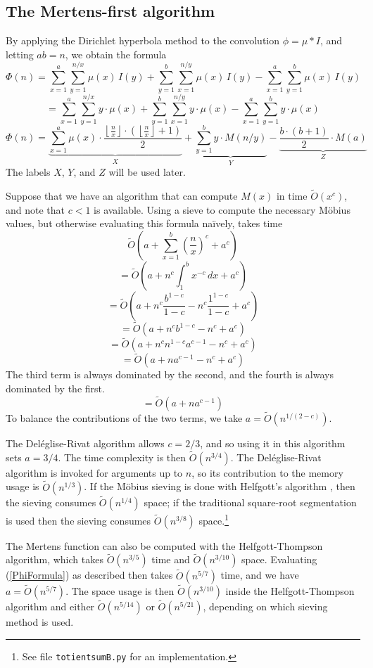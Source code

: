 \documentclass[12pt]{article}
\newcommand{\eqn}[1]{\begin{displaymath} #1 \end{displaymath}}
\newcommand{\neqn}[1]{\begin{equation} #1 \end{equation}}
\newcommand{\floor}[1]{{\left\lfloor #1 \right\rfloor}}
\newcommand{\integral}[4]{\displaystyle\int_{#3}^{#4} \! #1 \, d#2}
\newcommand{\floordiv}[2]{\floor{\frac{#1}{#2}}}
\newcommand{\softO}[0]{\widetilde{O}}
\begin{document}
\subsection{The Mertens-first algorithm}

By applying the Dirichlet hyperbola method to the convolution $\phi = \mu * I$, and letting $ab=n$, we obtain the formula
\eqn{\Phi(n) = \sum_{x=1}^{a}\sum_{y=1}^{n/x} \mu(x) \, I(y) + \sum_{y=1}^{b}\sum_{x=1}^{n/y} \mu(x) \, I(y) - \sum_{x=1}^{a}\sum_{y=1}^{b} \mu(x) \, I(y)}
\eqn{ = \sum_{x=1}^{a}\sum_{y=1}^{n/x} y \cdot \mu(x) + \sum_{y=1}^{b}\sum_{x=1}^{n/y} y \cdot \mu(x) - \sum_{x=1}^{a}\sum_{y=1}^{b} y \cdot \mu(x)}
\neqn{\Phi(n) = \underbrace{\sum_{x=1}^{a} \mu(x) \cdot \frac{\floordiv{n}{x} \cdot \left(\floordiv{n}{x} + 1\right)}{2}}_{X} + \underbrace{\sum_{y=1}^{b} y \cdot M(n/y)}_{Y} - \underbrace{\frac{b \cdot (b+1)}{2} \cdot M(a)}_{Z} \label{PhiFormula}}
The labels $X$, $Y$, and $Z$ will be used later.

Suppose that we have an algorithm that can compute $M(x)$ in time $\softO(x^c)$, and note that $c < 1$ is available.  Using a sieve to compute the necessary M\"obius values, but otherwise evaluating this formula na\"{i}vely, takes time
\eqn{\softO\left( a + \sum_{x=1}^b \left(\frac{n}{x}\right)^c + a^c \right)}
\eqn{=\softO\left( a + n^c \integral{x^{-c}}{x}{1}{b} + a^c \right)}
\eqn{=\softO\left( a + n^c\frac{b^{1-c}}{1-c} - n^c\frac{1^{1-c}}{1-c} + a^c \right)}
\eqn{=\softO\left( a + n^c b^{1-c} - n^c + a^c \right)}
\eqn{=\softO\left( a + n^c n^{1-c} a^{c-1} - n^c + a^c \right)}
\eqn{=\softO\left( a + n a^{c-1} - n^c + a^c \right)}
The third term is always dominated by the second, and the fourth is always dominated by the first.
\eqn{=\softO\left( a + n a^{c-1} \right)}
To balance the contributions of the two terms, we take $a = \softO(n^{1/(2-c)})$.

The Del\'{e}glise-Rivat algorithm \cite{DR1996} allows $c=2/3$, and so using it in this algorithm sets $a=3/4$.  The time complexity is then $\softO(n^{3/4})$. 
 The Del\'{e}glise-Rivat algorithm is invoked for arguments up to $n$, so its contribution to the memory usage is $\softO(n^{1/3})$.  If the M\"{o}bius sieving is done with Helfgott's algorithm \cite{Helfgott2020}, then the sieving consumes $\softO(n^{1/4})$ space; if the traditional square-root segmentation is used then the sieving consumes $\softO(n^{3/8})$ space.\footnote{See file \texttt{totientsumB.py} for an implementation.}

The Mertens function can also be computed with the Helfgott-Thompson algorithm, which takes $\softO(n^{3/5})$ time and $\softO(n^{3/10})$ space.  Evaluating (\ref{PhiFormula}) as described then takes $\softO(n^{5/7})$ time, and we have $a = \softO(n^{5/7})$.  The space usage is then $\softO(n^{3/10})$ inside the Helfgott-Thompson algorithm and either $\softO(n^{5/14})$ or $\softO(n^{5/21})$, depending on which sieving method is used.
\end{document}
